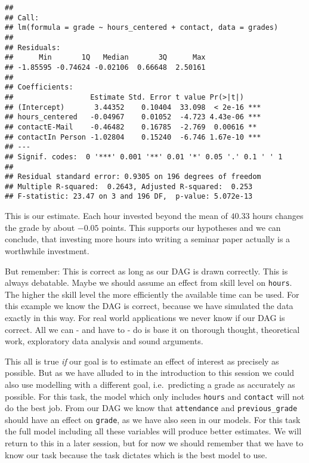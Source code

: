 \documentclass[
]{book}
\begin{document}
\begin{verbatim}
## 
## Call:
## lm(formula = grade ~ hours_centered + contact, data = grades)
## 
## Residuals:
##      Min       1Q   Median       3Q      Max 
## -1.85595 -0.74624 -0.02106  0.66648  2.50161 
## 
## Coefficients:
##                  Estimate Std. Error t value Pr(>|t|)    
## (Intercept)       3.44352    0.10404  33.098  < 2e-16 ***
## hours_centered   -0.04967    0.01052  -4.723 4.43e-06 ***
## contactE-Mail    -0.46482    0.16785  -2.769  0.00616 ** 
## contactIn Person -1.02804    0.15240  -6.746 1.67e-10 ***
## ---
## Signif. codes:  0 '***' 0.001 '**' 0.01 '*' 0.05 '.' 0.1 ' ' 1
## 
## Residual standard error: 0.9305 on 196 degrees of freedom
## Multiple R-squared:  0.2643, Adjusted R-squared:  0.253 
## F-statistic: 23.47 on 3 and 196 DF,  p-value: 5.072e-13
\end{verbatim}

This is our estimate. Each hour invested beyond the mean of \(40.33\) hours
changes the grade by about \(-0.05\) points. This supports our hypotheses and we
can conclude, that investing more hours into writing a seminar paper actually
is a worthwhile investment.

But remember: This is correct as long as our DAG is drawn correctly. This is
always debatable. Maybe we should assume an effect from skill level on \texttt{hours}.
The higher the skill level the more efficiently the available time can be used.
For this example we know the DAG is correct, because we have simulated the data
exactly in this way. For real world applications we never know if our DAG is
correct. All we can - and have to - do is base it on thorough thought,
theoretical work, exploratory data analysis and sound arguments.

This all is true \emph{if} our goal is to estimate an effect of interest as precisely
as possible. But as we have alluded to in the introduction to this session we
could also use modelling with a different goal, i.e.~predicting a grade as
accurately as possible. For this task, the model which only includes \texttt{hours} and
\texttt{contact} will not do the best job. From our DAG we know that \texttt{attendance} and
\texttt{previous\_grade} should have an effect on \texttt{grade}, as we have also seen in our
models. For this task the full model including all these variables will produce
better estimates. We will return to this in a later session, but for now we
should remember that we have to know our task because the task dictates which is
the best model to use.
\end{document}
